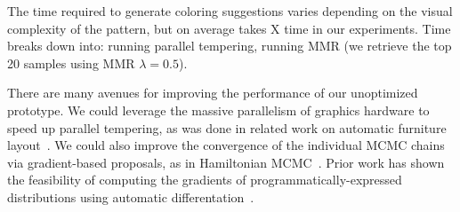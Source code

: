 The time required to generate coloring suggestions varies depending on the visual complexity of the pattern, but on average takes X time in our experiments. Time breaks down into: running parallel tempering, running MMR (we retrieve the top 20 samples using MMR $\lambda = 0.5$).

There are many avenues for improving the performance of our unoptimized prototype. We could leverage the massive parallelism of graphics hardware to speed up parallel tempering, as was done in related work on automatic furniture layout~\cite{MerrellFurnitureLayout}. We could also improve the convergence of the individual MCMC chains via gradient-based proposals, as in Hamiltonian MCMC~\cite{HamiltonianMCMC}. Prior work has shown the feasibility of computing the gradients of programmatically-expressed distributions using automatic differentation~\cite{AutoDiff}. 